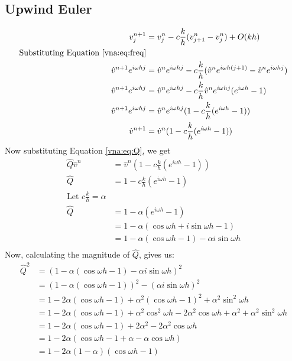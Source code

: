 \subsection{Upwind Euler}
\begin{align*}
    v_j^{n+1}	&= v_j^n - c\frac{k}{h}(v_{j+1}^n - v_j^n) + O(kh)					\\
    \text{Substituting Equation \ref{vna:eq:freq}} 							\\
    \hat{v}^{n+1}e^{i\omega hj} &= \hat{v}^ne^{i\omega hj} - c\frac{k}{h} (\hat{v}^ne^{i\omega h(j+1)} - \hat{v}^ne^{i\omega hj})									    \\
    \hat{v}^{n+1}e^{i\omega hj} &= \hat{v}^ne^{i\omega hj} - c\frac{k}{h} \hat{v}^ne^{i\omega hj} (e^{i\omega h} - 1)												    \\
    \hat{v}^{n+1}e^{i\omega hj} &= \hat{v}^ne^{i\omega hj}(1 - c\frac{k}{h} (e^{i\omega h} - 1))	\\
    \hat{v}^{n+1} &= \hat{v}^n(1 - c\frac{k}{h} (e^{i\omega h} - 1))					\\
\end{align*}
Now substituting Equation \ref{vna:eq:Q}, we get
\begin{align*}
    \hat{Q}\hat{v}^n &= \hat{v}^n(1 - c\frac{k}{h} (e^{i\omega h} - 1))	\\
    \hat{Q} &= 1 - c\frac{k}{h} (e^{i\omega h} - 1)			\\
    \text{Let } c\frac{k}{h} = \alpha 					\\
    \hat{Q} &= 1 - \alpha (e^{i\omega h} - 1)				\\
	    &= 1 - \alpha (\cos \omega h 	+ i \sin \omega h - 1)	\\
	    &= 1 - \alpha (\cos \omega h - 1) 	- \alpha i \sin \omega h\\
\end{align*}
Now, calculating the magnitude of $\hat{Q}$, gives us:
\begin{align*}
    \hat{Q}^2 &= (1 - \alpha (\cos \omega h  - 1)	- \alpha i \sin \omega h )^2									\\
	      &= (1 - \alpha (\cos \omega h  - 1))^2 	- (\alpha i \sin \omega h )^2									\\
	      &= 1  - 2\alpha (\cos \omega h  - 1) 	+ \alpha^2(\cos \omega h  -1)^2	+ \alpha^2 \sin^2 \omega h					\\
	      &= 1  - 2\alpha (\cos \omega h  - 1) 	+ \alpha^2 \cos^2 \omega h - 2\alpha^2 \cos \omega h	+ \alpha^2 + \alpha^2 \sin^2 \omega h	\\
	      &= 1  - 2\alpha (\cos \omega h  - 1) 	+ 2\alpha^2 - 2\alpha^2 \cos \omega h								\\
	      &= 1  - 2\alpha (\cos \omega h  - 1 + \alpha - \alpha \cos \omega h)									\\
	      &= 1  - 2\alpha(1 - \alpha) (\cos \omega h  - 1)												\\
\end{align*}
